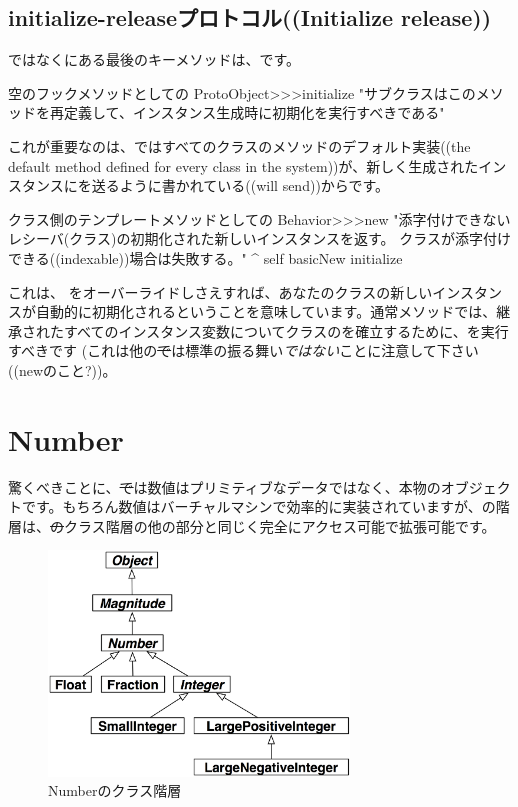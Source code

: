\documentclass[a4paper,10pt,twoside]{book}
\begin{document}
\subsection{initialize-releaseプロトコル((Initialize release))}

ではなくにある最後のキーメソッドは、です。

\begin{method}{空のフックメソッドとしての}
ProtoObject>>>initialize
   "サブクラスはこのメソッドを再定義して、インスタンス生成時に初期化を実行すべきである"
\end{method}

これが重要なのは、\pharo ではすべてのクラスのメソッドのデフォルト実装((the default  method defined for every class in the system))が、新しく生成されたインスタンスにを送るように書かれている((will send))からです。

\begin{method}{クラス側のテンプレートメソッドとしての}
Behavior>>>new
    "添字付けできないレシーバ(クラス)の初期化された新しいインスタンスを返す。
    クラスが添字付けできる((indexable))場合は失敗する。"
    ^ self basicNew initialize
\end{method}

これは、 をオーバーライドしさえすれば、あなたのクラスの新しいインスタンスが自動的に初期化されるということを意味しています。通常メソッドでは、継承されたすべてのインスタンス変数についてクラスのを確立するために、を実行すべきです
(これは他の\st では標準の振る舞い\emph{ではない}ことに注意して下さい((newのこと?))。

\section{Number}
驚くべきことに、\st では数値はプリミティブなデータではなく、本物のオブジェクトです。もちろん数値はバーチャルマシンで効率的に実装されていますが、の階層は、\st のクラス階層の他の部分と同じく完全にアクセス可能で拡張可能です。

\begin{figure}[ht]
\centerline {\includegraphics[width=8cm]{NumberHierarchy}}
\caption{Numberのクラス階層 }
\end{figure}
\end{document}
